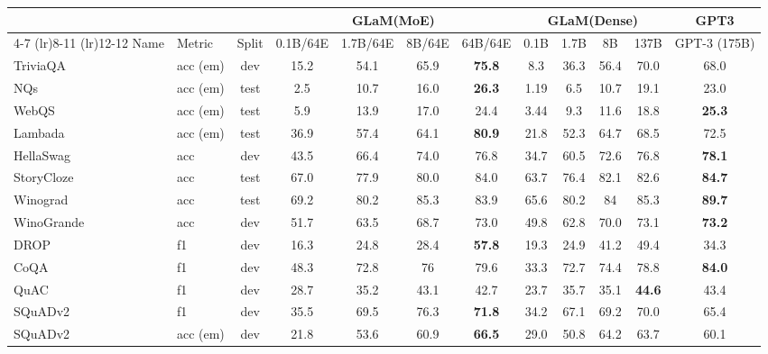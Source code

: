 \documentclass{article}
\newcommand{\glam}{GLaM\xspace}
\begin{document}
\begin{table*}[htb]
    \centering
    \renewcommand\tabcolsep{5pt}
    \renewcommand{\arraystretch}{1.4}
            \caption{One-shot scores on all 29 benchmarks for GPT3 and different \glam MoE and dense models.}
        \label{tab:1shot}
        \vskip 0.1in
    \footnotesize
    \begin{tabular}{llcccccccccc}
        \toprule
      & & & \multicolumn{4}{c}{\bf \glam(MoE)} & \multicolumn{4}{c}{\bf \glam(Dense)} & {\bf GPT3}\\
        \cmidrule(lr){4-7} \cmidrule(lr){8-11} \cmidrule(lr){12-12}
        Name & Metric & Split & 0.1B/64E & 1.7B/64E & 8B/64E & 64B/64E & 0.1B & 1.7B & 8B & 137B & GPT-3 (175B)\\
        \midrule
        TriviaQA & acc (em) & dev & 15.2 & 54.1 & 65.9 & \textbf{75.8} & 8.3 & 36.3 & 56.4 & 70.0 & 68.0\\
        NQs & acc (em) & test & 2.5 & 10.7 & 16.0 & \textbf{26.3} & 1.19 & 6.5 & 10.7 & 19.1 & 23.0\\
        WebQS & acc (em) & test & 5.9 & 13.9 & 17.0 & 24.4 & 3.44 & 9.3 & 11.6 & 18.8 & \textbf{25.3}\\
        \addlinespace
        Lambada & acc (em) & test & 36.9 & 57.4 & 64.1 & \textbf{80.9} & 21.8 & 52.3 & 64.7 & 68.5 & 72.5\\
        HellaSwag & acc & dev & 43.5 & 66.4 & 74.0 & 76.8 & 34.7 & 60.5 & 72.6 & 76.8 & \textbf{78.1}\\
        StoryCloze & acc & test & 67.0 & 77.9 & 80.0 & 84.0 & 63.7 & 76.4 & 82.1 & 82.6 & \textbf{84.7}\\
        \addlinespace
        Winograd & acc & test & 69.2 & 80.2 & 85.3 & 83.9 & 65.6 & 80.2 & 84 & 85.3 & \textbf{89.7}\\
        WinoGrande & acc & dev & 51.7 & 63.5 & 68.7 & 73.0 & 49.8 & 62.8 & 70.0 & 73.1 & \textbf{73.2}\\
        \addlinespace
        DROP & f1 & dev & 16.3 & 24.8 & 28.4 & \textbf{57.8} & 19.3 & 24.9 & 41.2 & 49.4 & 34.3\\
        CoQA & f1 & dev& 48.3 & 72.8 & 76 & 79.6 & 33.3 & 72.7 & 74.4 & 78.8 & \textbf{84.0}\\
        QuAC & f1 & dev & 28.7 & 35.2 & 43.1 & 42.7 & 23.7 & 35.7 & 35.1 & \textbf{44.6} & 43.4\\
        SQuADv2 & f1 & dev & 35.5 & 69.5 & 76.3 & \textbf{71.8} & 34.2 & 67.1 & 69.2 & 70.0 & 65.4\\        
        SQuADv2 & acc (em) & dev & 21.8 & 53.6 & 60.9 & \textbf{66.5} & 29.0 & 50.8 & 64.2 & 63.7 & 60.1\\

\end{tabular}
\end{table*}
\end{document}
